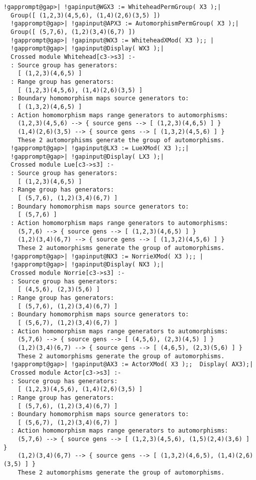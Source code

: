\documentclass[a4paper,11pt]{report}
\begin{document}
{{\begin{Verbatim}[commandchars=!@|,fontsize=\small,frame=single,label=Example]
  !gapprompt@gap>| !gapinput@WGX3 := WhiteheadPermGroup( X3 );|
  Group([ (1,2,3)(4,5,6), (1,4)(2,6)(3,5) ])
  !gapprompt@gap>| !gapinput@APX3 := AutomorphismPermGroup( X3 );|
  Group([ (5,7,6), (1,2)(3,4)(6,7) ])
  !gapprompt@gap>| !gapinput@WX3 := WhiteheadXMod( X3 );; |
  !gapprompt@gap>| !gapinput@Display( WX3 );|
  Crossed module Whitehead[c3->s3] :- 
  : Source group has generators:
    [ (1,2,3)(4,6,5) ]
  : Range group has generators:
    [ (1,2,3)(4,5,6), (1,4)(2,6)(3,5) ]
  : Boundary homomorphism maps source generators to:
    [ (1,3,2)(4,6,5) ]
  : Action homomorphism maps range generators to automorphisms:
    (1,2,3)(4,5,6) --> { source gens --> [ (1,2,3)(4,6,5) ] }
    (1,4)(2,6)(3,5) --> { source gens --> [ (1,3,2)(4,5,6) ] }
    These 2 automorphisms generate the group of automorphisms.
  !gapprompt@gap>| !gapinput@LX3 := LueXMod( X3 );;|
  !gapprompt@gap>| !gapinput@Display( LX3 );|
  Crossed module Lue[c3->s3] :- 
  : Source group has generators:
    [ (1,2,3)(4,6,5) ]
  : Range group has generators:
    [ (5,7,6), (1,2)(3,4)(6,7) ]
  : Boundary homomorphism maps source generators to:
    [ (5,7,6) ]
  : Action homomorphism maps range generators to automorphisms:
    (5,7,6) --> { source gens --> [ (1,2,3)(4,6,5) ] }
    (1,2)(3,4)(6,7) --> { source gens --> [ (1,3,2)(4,5,6) ] }
    These 2 automorphisms generate the group of automorphisms.
  !gapprompt@gap>| !gapinput@NX3 := NorrieXMod( X3 );; |
  !gapprompt@gap>| !gapinput@Display( NX3 );|
  Crossed module Norrie[c3->s3] :- 
  : Source group has generators:
    [ (4,5,6), (2,3)(5,6) ]
  : Range group has generators:
    [ (5,7,6), (1,2)(3,4)(6,7) ]
  : Boundary homomorphism maps source generators to:
    [ (5,6,7), (1,2)(3,4)(6,7) ]
  : Action homomorphism maps range generators to automorphisms:
    (5,7,6) --> { source gens --> [ (4,5,6), (2,3)(4,5) ] }
    (1,2)(3,4)(6,7) --> { source gens --> [ (4,6,5), (2,3)(5,6) ] }
    These 2 automorphisms generate the group of automorphisms.
  !gapprompt@gap>| !gapinput@AX3 := ActorXMod( X3 );;  Display( AX3);|
  Crossed module Actor[c3->s3] :- 
  : Source group has generators:
    [ (1,2,3)(4,5,6), (1,4)(2,6)(3,5) ]
  : Range group has generators:
    [ (5,7,6), (1,2)(3,4)(6,7) ]
  : Boundary homomorphism maps source generators to:
    [ (5,6,7), (1,2)(3,4)(6,7) ]
  : Action homomorphism maps range generators to automorphisms:
    (5,7,6) --> { source gens --> [ (1,2,3)(4,5,6), (1,5)(2,4)(3,6) ] }
    (1,2)(3,4)(6,7) --> { source gens --> [ (1,3,2)(4,6,5), (1,4)(2,6)(3,5) ] }
    These 2 automorphisms generate the group of automorphisms.
  

\end{Verbatim}}}
\end{document}
